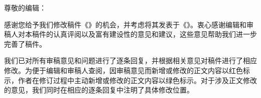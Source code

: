 \documentclass[11pt]{article}
\begin{document}
尊敬的编辑：\par
\vspace{0.50\baselineskip}
感谢您给予我们修改稿件《\ManuscriptTitle》的机会，并考虑将其发表于《\JournalName》。衷心感谢编辑和审稿人对本稿件的认真评阅以及富有建设性的意见和建议，这些意见帮助我们进一步完善了稿件。\par
\vspace{0.62\baselineskip}
我们已对所有审稿意见和问题进行了逐条回复，并根据相关意见对稿件进行了相应修改。为便于编辑和审稿人查阅，因审稿意见而新增或修改的正文内容以红色标示，作者在修订过程中主动新增或修改的正文内容以绿色标示。对于涉及正文修改的意见，我们同时在相应的逐条回复中注明了具体修改位置。\par
\vspace{1.05\baselineskip}
\CorrespondenceAuthorsZh

\clearpage

\end{document}
